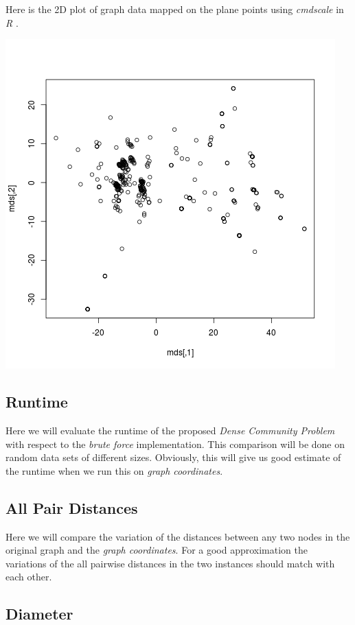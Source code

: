 \documentclass{article}
\begin{document}
        Here is the 2D plot of graph data mapped on the plane points using {\em cmdscale} in {\em R} \cite{cmdscale}.
        
        \includegraphics[scale=0.8]{fb0_2d.png}
        
        \subsection{Runtime}
        
            Here we will evaluate the runtime of the proposed {\em Dense Community Problem} with respect to the {\em brute force} implementation. This comparison will be done on random data sets of different sizes. Obviously, this will give us good estimate of the runtime when we run this on {\em graph coordinates}.
        
        \subsection{All Pair Distances}
        
            Here we will compare the variation of the distances between any two nodes in the original graph and the {\em graph coordinates}. For a good approximation the variations of the all pairwise distances in the two instances should match with each other.
            
        \subsection{Diameter}
            
\end{document}
